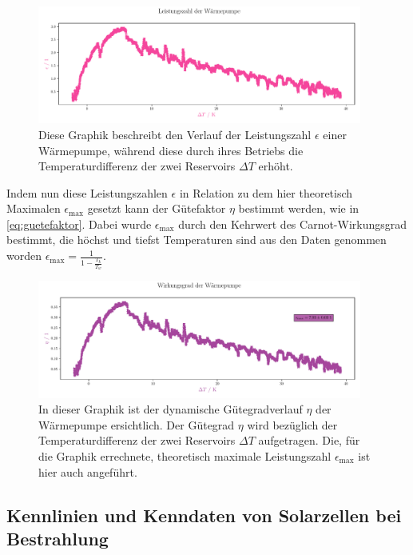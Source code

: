 \documentclass[12pt,english,ngerman]{scrartcl}
\begin{document}
\begin{figure}[H]
	\centering
	\includegraphics[width=0.95\textwidth]{figures/leistungszahlVerlauf.pdf}
	\caption[Leistungszahlkennlinie Wärmepumpe]{Diese Graphik beschreibt den Verlauf der
		Leistungszahl $\epsilon$ einer Wärmepumpe, während diese durch ihres Betriebs
		die Temperaturdifferenz der zwei Reservoirs $\Delta T$ erhöht.
	}\label{fig:leistungszahlVerlauf}
\end{figure}

Indem nun diese Leistungszahlen $\epsilon$ in Relation zu dem hier theoretisch
Maximalen $\epsilon_\text{max}$ gesetzt kann der Gütefaktor $\eta$ bestimmt
werden, wie in \autoref{eq:guetefaktor}. Dabei wurde $\epsilon_\text{max}$
durch den Kehrwert des Carnot-Wirkungsgrad bestimmt, die höchst und tiefst
Temperaturen sind aus den Daten genommen worden $\epsilon_\text{max} =
	\frac{1}{1-\frac{T_k}{T_w}}$.

\begin{figure}[H]
	\centering
	\includegraphics[width=0.95\textwidth]{figures/wirkungsgradVerlauf.pdf}
	\caption{In dieser Graphik ist der dynamische Gütegradverlauf $\eta$ der
		Wärmepumpe ersichtlich. Der Gütegrad $\eta$ wird bezüglich der
		Temperaturdifferenz der zwei Reservoirs $\Delta T$ aufgetragen. Die,
		für die Graphik errechnete, theoretisch maximale Leistungszahl
		$\epsilon_\text{max}$ ist hier auch angeführt.
	}\label{fig:wirkungsgradVerlauf}
\end{figure}

\subsection{Kennlinien und Kenndaten von Solarzellen bei Bestrahlung}
\end{document}
